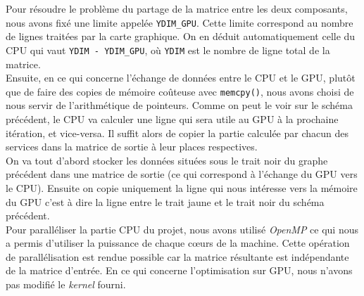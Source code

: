 	Pour résoudre le problème du partage de la matrice entre les deux composants, nous avons fixé une limite appelée \verb?YDIM_GPU?. Cette limite correspond au nombre de lignes traitées par la carte graphique. On en déduit automatiquement celle du CPU qui vaut \verb?YDIM - YDIM_GPU?, où \verb?YDIM? est le nombre de ligne total de la matrice.\\
	
	Ensuite, en ce qui concerne l'échange de données entre le CPU et le GPU, plutôt que de faire des copies de mémoire coûteuse avec \verb?memcpy()?, nous avons choisi de nous servir de l'arithmétique de pointeurs. Comme on peut le voir sur le schéma précédent, le CPU va calculer une ligne qui sera utile au GPU à la prochaine itération, et vice-versa. Il suffit alors de copier la partie calculée par chacun des services dans la matrice de sortie à leur places respectives.\\
	
	On va tout d'abord stocker  les données situées sous le trait noir du graphe précédent dans une matrice de sortie (ce qui correspond à l'échange du GPU vers le CPU). Ensuite on copie uniquement la ligne qui nous intéresse vers la mémoire du GPU c'est à dire la ligne entre le trait jaune et le trait noir du schéma précédent.\\
	
	Pour paralléliser la partie CPU du projet, nous avons utilisé \textit{OpenMP} ce qui nous a permis d'utiliser la puissance de chaque c\oe{}urs de la machine. Cette opération de parallélisation est rendue possible car la matrice résultante est indépendante de la matrice d'entrée. En ce qui concerne l'optimisation sur GPU, nous n'avons pas modifié le \textit{kernel} fourni.
